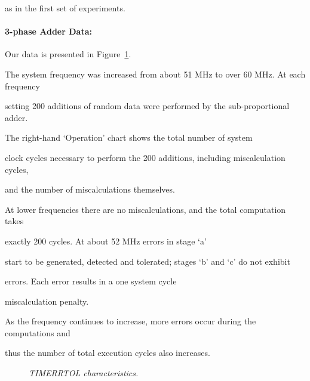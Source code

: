 \documentclass[12pt,dvips]{article}
\begin{document}
as in the first set of experiments.



\paragraph{3-phase Adder Data: }

Our data is presented in Figure~\ref{sbprpperfop}.

The system frequency was increased from about 51 MHz to over 60 MHz. At each frequency

setting 200 additions of random data were performed by the sub-proportional adder.

The right-hand `Operation' chart shows the total number of system

clock cycles necessary to perform the 200 additions, including miscalculation cycles,

and the number of miscalculations themselves. 

At lower frequencies there are no miscalculations, and the total computation takes

exactly 200 cycles. At about 52 MHz errors in stage `a'

start to be generated, detected and tolerated; stages `b' and `c' do not exhibit

errors. Each error results in a one system cycle

miscalculation penalty.

As the frequency continues to increase, more errors occur during the computations and

thus the number of total execution cycles also increases. 



\begin{figure}

\centering

\begin{minipage}{3.5in}


\end{minipage}

\begin{minipage}{2.9in}



\end{minipage}

\caption{{\em TIMERRTOL characteristics.} }

\label{sbprpperfop}

\end{figure}
\end{document}
